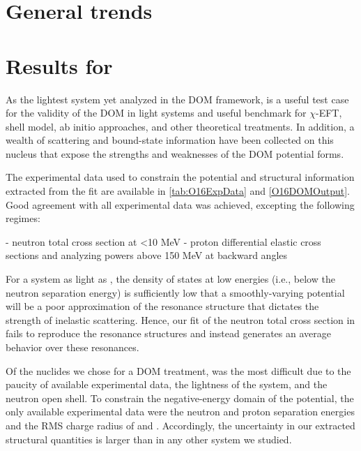 \section{General trends}

\section{Results for \oSixEight}
As the lightest system yet analyzed in the DOM framework, \oSix is a useful test case
for the validity of the DOM in light systems and useful benchmark for $\chi$-EFT, shell model, ab
initio approaches, and other theoretical treatments. In addition, a wealth of scattering and
bound-state information have been collected on this nucleus that expose the strengths and
weaknesses of the DOM potential forms.

The experimental data used to constrain the \oSix potential and structural information extracted
from the fit are available in \ref{tab:O16ExpData} and \ref{O16DOMOutput}. Good agreement with all 
experimental data was achieved, excepting the following regimes:

- neutron total cross section at <10 MeV
- proton differential elastic cross sections and analyzing powers above 150 MeV at backward angles

For a system as light as \oSix, the density of states at low energies (i.e., below the neutron
separation energy) is sufficiently low that a smoothly-varying potential will be a poor
approximation of the resonance structure that dictates the strength of inelastic scattering. Hence,
our fit of the neutron total cross section in \oSix fails to reproduce the resonance structures and
instead generates an average behavior over these resonances.

Of the nuclides we chose for a DOM treatment, \oEight was the most difficult due to the paucity of
available experimental data, the lightness of the system, and the neutron open shell. To constrain the negative-energy domain
of the potential, the only available experimental data were the neutron and proton separation
energies and the RMS charge radius of \oEight and \neEight. Accordingly, the uncertainty in our extracted structural quantities is
larger than in any other system we studied.

